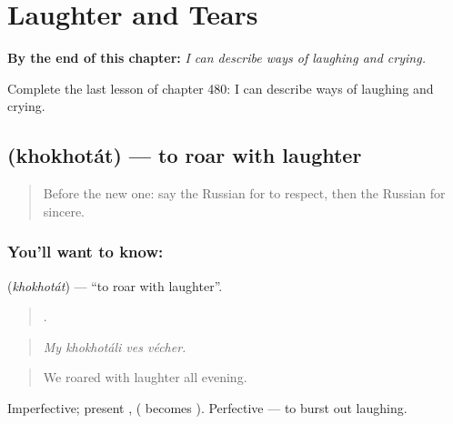 
\chapter{Laughter and Tears}
\label{ch:ru-laughter-and-tears}

\begin{chapteropening}
\textbf{By the end of this chapter:} \emph{I can describe ways of laughing and crying.}

Complete the last lesson of chapter 480: I can describe ways of laughing and crying.
\end{chapteropening}

\section[\texorpdfstring{\ru{хохотать} (khokhotát)}{хохотать (khokhotát)}]{ (khokhotát) — to roar with laughter}

\label{lesson:RU-C480-khokhotat}



\begin{quote}
Before the new one: say the Russian for to respect, then the Russian for sincere.
\end{quote}

\subsection*{You'll want to know: }
\textbf{} (\emph{khokhotát}) — \textquotedblleft{}to roar with laughter\textquotedblright{}.

\begin{quote}
   .
\end{quote}

\begin{quote}
\emph{My khokhotáli ves vécher.}
\end{quote}

\begin{quote}
We roared with laughter all evening.
\end{quote}

Imperfective; present ,  ( becomes ). Perfective  — to burst out laughing.

